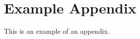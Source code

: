 \appendix
\chapter{Example Appendix}
\label{append:appendExample}

This is an example of an appendix.